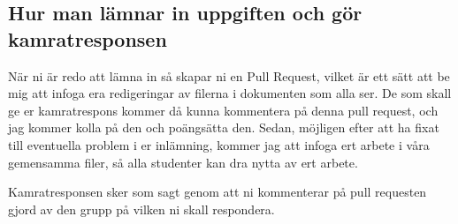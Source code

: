 \documentclass{tufte-handout}
\begin{document}
\subsection{Hur man lämnar in uppgiften och gör kamratresponsen}

När ni är redo att lämna in så skapar ni en Pull Request, vilket är ett sätt att be mig att infoga era redigeringar av filerna i dokumenten som alla ser. De som skall ge er kamratrespons kommer då kunna kommentera på denna pull request, och jag kommer kolla på den och poängsätta den. Sedan, möjligen efter att ha fixat till eventuella problem i er inlämning, kommer jag att infoga ert arbete i våra gemensamma filer, så alla studenter kan dra nytta av ert arbete.

Kamratresponsen sker som sagt genom att ni kommenterar på pull requesten gjord av den grupp på vilken ni skall respondera.



\end{document}

